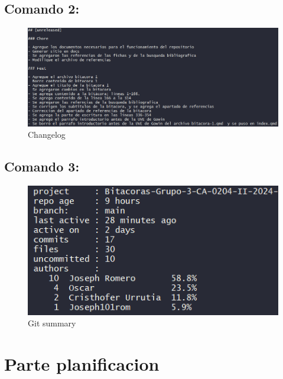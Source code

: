 \documentclass[
  letterpaper,
  DIV=11,
  numbers=noendperiod]{scrreprt}
\begin{document}
\section{Comando 2:}\label{comando-2}

\begin{figure}[H]

{\centering \includegraphics{imagenes/CHANGELOG-1.png}

}

\caption{Changelog}

\end{figure}%

\section{Comando 3:}\label{comando-3}

\begin{figure}[H]

{\centering \includegraphics{imagenes/gitsummary-1.png}

}

\caption{Git summary}

\end{figure}%


\chapter{Parte planificacion}\label{parte-planificacion}
\end{document}
